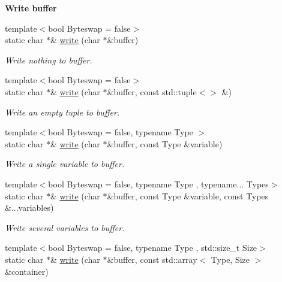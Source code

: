 \begin{Indent}{\bf Write buffer}\par
\begin{DoxyCompactItemize}
\item 
{\footnotesize template$<$bool Byteswap = false$>$ }\\static char $\ast$\& \hyperlink{exceptionmagrathea_1_1DataHandler_a536f2b5c4b87cd899177ee5397df87b1}{write} (char $\ast$\&buffer)
\begin{DoxyCompactList}\small\item\em Write nothing to buffer. \end{DoxyCompactList}\item 
{\footnotesize template$<$bool Byteswap = false$>$ }\\static char $\ast$\& \hyperlink{exceptionmagrathea_1_1DataHandler_a40bb3b3f12dbbfb56f0ae4949ab775dc}{write} (char $\ast$\&buffer, const std\-::tuple$<$$>$ \&)
\begin{DoxyCompactList}\small\item\em Write an empty tuple to buffer. \end{DoxyCompactList}\item 
{\footnotesize template$<$bool Byteswap = false, typename Type $>$ }\\static char $\ast$\& \hyperlink{exceptionmagrathea_1_1DataHandler_a50f7ac2d71d0a6e12b9142f0164e5010}{write} (char $\ast$\&buffer, const Type \&variable)
\begin{DoxyCompactList}\small\item\em Write a single variable to buffer. \end{DoxyCompactList}\item 
{\footnotesize template$<$bool Byteswap = false, typename Type , typename... Types$>$ }\\static char $\ast$\& \hyperlink{exceptionmagrathea_1_1DataHandler_abfa5fea125d9fc30fb1ead5d96a73b11}{write} (char $\ast$\&buffer, const Type \&variable, const Types \&...variables)
\begin{DoxyCompactList}\small\item\em Write several variables to buffer. \end{DoxyCompactList}\item 
{\footnotesize template$<$bool Byteswap = false, typename Type , std\-::size\-\_\-t Size$>$ }\\static char $\ast$\& \hyperlink{exceptionmagrathea_1_1DataHandler_aedc8c73ee5a6027286662b816435f953}{write} (char $\ast$\&buffer, const std\-::array$<$ Type, Size $>$ \&container)
$$
\end{DoxyCompactItemize}
\end{Indent}
